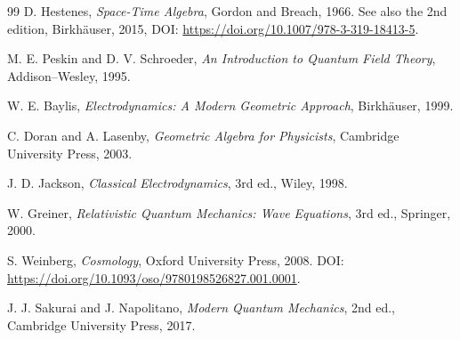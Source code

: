 \documentclass[10pt,letterpaper]{article}
\begin{document}
\begin{thebibliography}{99}
D. Hestenes, \emph{Space-Time Algebra}, Gordon and Breach, 1966. See also the 2nd edition, Birkh\"auser, 2015, DOI: \url{https://doi.org/10.1007/978-3-319-18413-5}.

M. E. Peskin and D. V. Schroeder, \emph{An Introduction to Quantum Field
Theory}, Addison--Wesley, 1995.

W. E. Baylis, \emph{Electrodynamics: A Modern Geometric Approach}, Birkh\"auser, 1999.

C. Doran and A. Lasenby, \emph{Geometric Algebra for Physicists}, Cambridge University Press, 2003.

J. D. Jackson, \emph{Classical Electrodynamics}, 3rd ed., Wiley, 1998.

W. Greiner, \emph{Relativistic Quantum Mechanics: Wave Equations}, 3rd ed., Springer, 2000.

S. Weinberg, \emph{Cosmology}, Oxford University Press, 2008. DOI:
\url{https://doi.org/10.1093/oso/9780198526827.001.0001}.

J. J. Sakurai and J. Napolitano, \emph{Modern Quantum Mechanics}, 2nd ed., Cambridge University Press, 2017.
\end{thebibliography}
\endgroup
\end{document}
